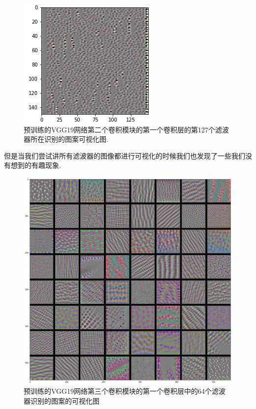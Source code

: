 \documentclass[lang=cn,11pt]{elegantpaper}
\begin{document}
\begin{figure}[hbtp]
  \includegraphics{block2_conv1_127.png}
  \caption{预训练的VGG19网络第二个卷积模块的第一个卷积层的第127个滤波器所在识别的图案可视化图.\label{fig:pretrain-singal}}
\end{figure}


但是当我们尝试讲所有滤波器的图像都进行可视化的时候我们也发现了一些我们没有想到的有趣现象.

\begin{figure}[hbtp]
\centering
  \includegraphics[width=0.8\linewidth]{block3_conv1}
  \caption{预训练的VGG19网络第三个卷积模块的第一个卷积层中的64个滤波器识别的图案的可视化图\label{fig:filter3}}
\end{figure}
\end{document}
